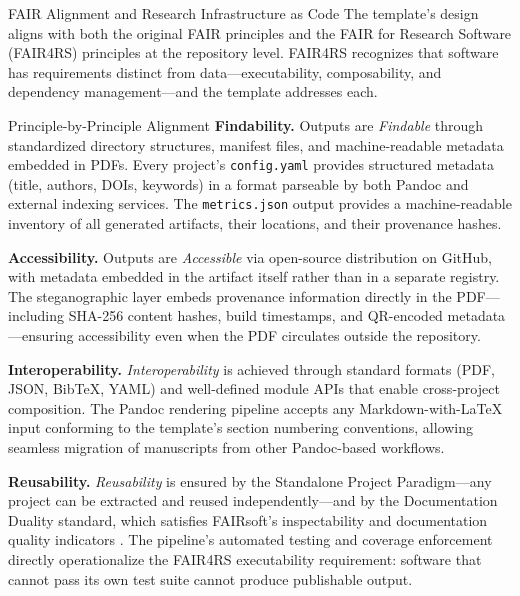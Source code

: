 \documentclass[
  ignorenonframetext,
]{beamer}
\author{\texorpdfstring{}{}}
\date{}
\begin{document}
\begin{frame}{FAIR Alignment and Research
Infrastructure as Code}
\protect{}\label{fair-alignment-and-research-infrastructure-as-code}
The template's design aligns with both the original FAIR principles
 and the FAIR for Research Software (FAIR4RS)
principles  at the repository level. FAIR4RS
recognizes that software has requirements distinct from
data---executability, composability, and dependency management---and the
template addresses each.

\begin{block}{Principle-by-Principle Alignment}
\protect{}\label{principle-by-principle-alignment}
\textbf{Findability.} Outputs are \emph{Findable} through standardized
directory structures, manifest files, and machine-readable metadata
embedded in PDFs. Every project's \texttt{config.yaml} provides
structured metadata (title, authors, DOIs, keywords) in a format
parseable by both Pandoc and external indexing services. The
\texttt{metrics.json} output provides a machine-readable inventory of
all generated artifacts, their locations, and their provenance hashes.

\textbf{Accessibility.} Outputs are \emph{Accessible} via open-source
distribution on GitHub, with metadata embedded in the artifact itself
rather than in a separate registry. The steganographic layer embeds
provenance information directly in the PDF---including SHA-256 content
hashes, build timestamps, and QR-encoded metadata---ensuring
accessibility even when the PDF circulates outside the repository.

\textbf{Interoperability.} \emph{Interoperability} is achieved through
standard formats (PDF, JSON, BibTeX, YAML) and well-defined module APIs
that enable cross-project composition. The Pandoc rendering pipeline
accepts any Markdown-with-LaTeX input conforming to the template's
section numbering conventions, allowing seamless migration of
manuscripts from other Pandoc-based workflows.

\textbf{Reusability.} \emph{Reusability} is ensured by the Standalone
Project Paradigm---any project can be extracted and reused
independently---and by the Documentation Duality standard, which
satisfies FAIRsoft's inspectability and documentation quality indicators
. The pipeline's automated testing and coverage
enforcement directly operationalize the FAIR4RS executability
requirement: software that cannot pass its own test suite cannot produce
publishable output.
\end{block}


\end{frame}
\end{document}
